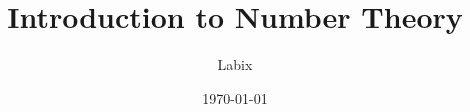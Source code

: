 \documentclass[a4paper]{article}
\title{Introduction to Number Theory}
\author{Labix}
\date{\today}
\begin{document}
\maketitle
\begin{abstract}
\end{abstract}
\tableofcontents
\pagebreak

\end{document}
